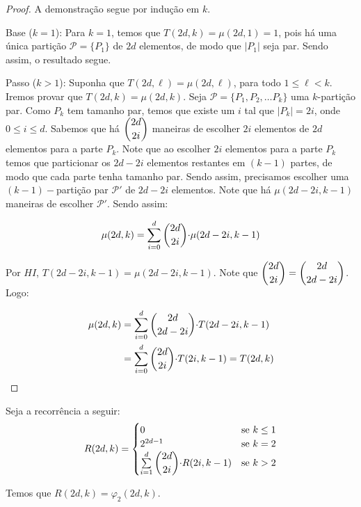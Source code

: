 \documentclass[12pt]{article}
\begin{document}
 \begin{proof}
 	A demonstração segue por indução em $k$. \newl
 	
 	Base ($k = 1$): Para $k = 1$, temos que $T(2d, k) = \mu(2d, 1) = 1$, pois há uma única partição $\mathcal{P}=\{P_1\}$ de $2d$ elementos, de modo que $|P_1|$ seja par. Sendo assim, o resultado segue. \newl
 	
 	Passo ($k > 1$): Suponha que $T(2d, \ell) = \mu(2d, \ell)$, para todo $1 \leq \ell < k$. Iremos provar que $T(2d, k) = \mu(2d, k)$. Seja $\mathcal{P} = \{P_1, P_2, \ldots P_k \}$ uma $k$-partição par. Como $P_k$ tem tamanho par, temos que existe um $i$ tal que $|P_k| = 2i$, onde $0 \leq i \leq d$. Sabemos que há $\escolhe{2d}{2i}$ maneiras de escolher $2i$ elementos de $2d$ elementos para a parte $P_k$. Note que ao escolher $2i$ elementos para a parte $P_k$ temos que particionar os $2d - 2i$ elementos restantes em $(k-1)$ partes, de modo que cada parte tenha tamanho par. Sendo assim, precisamos escolher uma $(k-1)-$partição par $\mathcal{P'}$ de $2d - 2i$ elementos. Note que há $\mu(2d - 2i, k-1)$ maneiras de escolher $\mathcal{P'}$. Sendo assim: 
 	
 	\begin{align}
 		\begin{split}
 			\mu(2d, k) = \sum\limits_{i = 0}^{d}\escolhe{2d}{2i} {\cdot} \mu(2d - 2i, k-1)
 		\end{split} 
 	\end{align} 
 	
 	Por $HI$, $T(2d - 2i, k-1) = \mu(2d - 2i, k-1)$. Note que $\escolhe{2d}{2i} = \escolhe{2d}{2d - 2i} $. Logo:
 	
 	\begin{align}
 		\begin{split}
 			\mu(2d, k) &= \sum\limits_{i = 0}^{d}\escolhe{2d}{2d - 2i} {\cdot} T(2d - 2i, k-1)\\
 			&= \sum\limits_{i = 0}^{d}\escolhe{2d}{2i} {\cdot} T(2i, k-1) = T(2d, k)
 		\end{split} 
 	\end{align}
 	
 \end{proof} \newl
 
 
  \begin{lema}  
 	\label{lema3}
 	Seja a recorrência a seguir: \\
 	
 	\begin{equation}
 		R(2d, k) =
 		\begin{cases}
 			0 & \text{se $k \leq 1$}\\
 			2^{2d - 1} & \text{se $k = 2$} \\
 			\sum\limits_{i = 1}^{d} \escolhe{2d}{2i} {\cdot} R(2i, k-1) & \text{se $k > 2$} \\ 
 		\end{cases}
 	\end{equation}
 	
 	Temos que $R(2d, k) = \varphi_2(2d, k)$.
 \end{lema}
  
\end{document}
